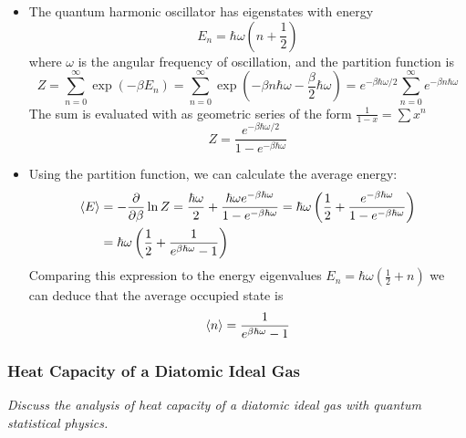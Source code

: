 \documentclass[11pt, a4paper]{article}
\begin{document}
\begin{itemize}
	\item The quantum harmonic oscillator has eigenstates with energy
	\begin{equation*}
		E_n = \hbar \omega \left (n + \frac{1}{2}\right )
	\end{equation*}
	where $ \omega  $ is the angular frequency of oscillation, and the partition function is
	\begin{equation*}
		Z = \sum_{n = 0}^{\infty} \exp(-\beta E_n) = \sum_{n=0}^{\infty} \exp(-\beta n \hbar \omega - \frac{\beta}{2}\hbar \omega) = e^{-\beta \hbar \omega/2} \sum_{n=0}^{\infty}e^{-\beta n \hbar \omega}
	\end{equation*}
	The sum is evaluated with as geometric series of the form $ \frac{1}{1-x} = \sum x^{n} $
	\begin{equation*}
		Z = \frac{ e^{-\beta \hbar \omega/2}}{1 - e^{-\beta \hbar \omega}}
	\end{equation*}

	\item Using the partition function, we can calculate the average energy:
	\begin{align*}
		\expval{E} &= - \pdv{}{\beta} \ln Z = \frac{ \hbar \omega}{2} + \frac{\hbar \omega e^{-\beta \hbar \omega}}{1- e^{-\beta \hbar \omega}} =   \hbar \omega\left(\frac{1}{2} + \frac{e^{-\beta \hbar \omega}}{1- e^{-\beta \hbar \omega}} \right)\\
		&=\hbar \omega \left( \frac{1}{2} + \frac{1}{e^{\beta \hbar \omega } - 1}\right)
	\end{align*}
	Comparing this expression to the energy eigenvalues $ E_n = \hbar \omega \left(\frac{1}{2} + n \right)  $ we can deduce that the average occupied state is
	\begin{equation*}
		\expval{n} = \frac{1}{e^{\beta \hbar \omega } - 1}
	\end{equation*}

\end{itemize}

\subsubsection{Heat Capacity of a Diatomic Ideal Gas} \label{sss:diatomic_C_V}
\textit{Discuss the analysis of heat capacity of a diatomic ideal gas with quantum statistical physics.}
\end{document}
